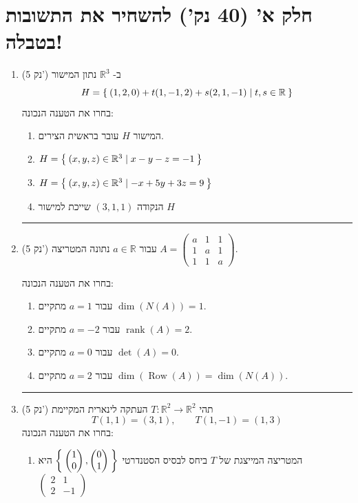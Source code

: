 \documentclass[12pt, a4paper]{article}
\newcommand{\rr}{\mathbb{R}}
\DeclareMathOperator{\rank}{rank}
\newcommand{\points}[1]{(#1 נק') }
\DeclareMathOperator{\row}{Row}
\begin{document}
\section*{
חלק א' 
(40 נק')
להשחיר את התשובות בטבלה!}
\begin{enumerate}
\item\points{5}
ב-
$\rr^3$
נתון המישור
$$H=\Set{(1,2,0)+t(1,-1,2)+s(2,1,-1) \mid t,s\in \rr}$$
בחרו את הטענה הנכונה:
\begin{enumerate}
\item
המישור
$H$
עובר בראשית הצירים.

\item
$H = \Set{(x,y,z)\in \rr^3\mid x-y-z=-1}$

\item[\fbox{\textcircled{ג}}]
$H=\Set{(x,y,z)\in \rr^3\mid-x+5y+3z=9}$

\item
הנקודה
$(3,1,1)$
שייכת למישור
$H$
\end{enumerate}

\noindent\rule{\textwidth-30pt}{0.4pt}


\item\points{5}
עבור
$a\in\rr$
נתונה המטריצה
$A=
\begin{pmatrix}
a&1&1\\
1&a&1\\
1&1&a
\end{pmatrix}$.

בחרו את הטענה הנכונה:
\begin{enumerate}
\item
עבור
$a=1$
מתקיים
$\dim(N(A))=1$.

\item[\fbox{\textcircled{ב}}]
עבור
$a=-2$
מתקיים
$\rank(A)=2$.

\item
עבור
$a=0$
מתקיים
$\det(A)=0$.

\item
עבור
$a=2$
מתקיים
$\dim(\row(A))=\dim(N(A))$.
\end{enumerate}

\noindent\rule{\textwidth-30pt}{0.4pt}

\item\points{5}
תהי
$T:\rr^2\to\rr^2$
העתקה לינארית המקיימת
$$T(1,1)=(3,1),\qquad T(1,-1)=(1,3)$$
בחרו את הטענה הנכונה:
\begin{enumerate}
\item[\fbox{\textcircled{א}}]
המטריצה המייצגת של
$T$
ביחס לבסיס הסטנדרטי 
$\Set{\begin{pmatrix}
    1 \\ 0
\end{pmatrix},
\begin{pmatrix}
    0 \\ 1
\end{pmatrix}
}$
היא
$\begin{pmatrix}
2&1\\
2&-1
\end{pmatrix}$


\end{enumerate}
\end{enumerate}
\end{document}
